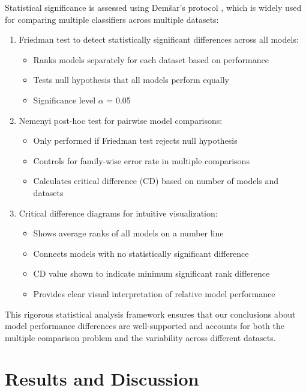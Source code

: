 \documentclass[12pt]{article}
\begin{document}
Statistical significance is assessed using Demšar's protocol \cite{demsar2006}, which is widely used for comparing multiple classifiers across multiple datasets:

\begin{enumerate}
\item Friedman test to detect statistically significant differences across all models:
    \begin{itemize}
    \item Ranks models separately for each dataset based on performance
    \item Tests null hypothesis that all models perform equally
    \item Significance level $\alpha$ = 0.05
    \end{itemize}

\item Nemenyi post-hoc test for pairwise model comparisons:
    \begin{itemize}
    \item Only performed if Friedman test rejects null hypothesis
    \item Controls for family-wise error rate in multiple comparisons
    \item Calculates critical difference (CD) based on number of models and datasets
    \end{itemize}

\item Critical difference diagrams for intuitive visualization:
    \begin{itemize}
    \item Shows average ranks of all models on a number line
    \item Connects models with no statistically significant difference
    \item CD value shown to indicate minimum significant rank difference
    \item Provides clear visual interpretation of relative model performance
    \end{itemize}
\end{enumerate}

This rigorous statistical analysis framework ensures that our conclusions about model performance differences are well-supported and accounts for both the multiple comparison problem and the variability across different datasets.


\section{Results and Discussion}
\end{document}
